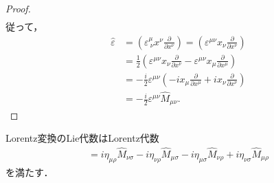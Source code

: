 \begin{proof}
\begin{align}
	\end{align}
	従って，
	\begin{align}
		\hat{\varepsilon} & =\left(\varepsilon^{\mu}_{\ \nu}x^{\nu}\frac{\partial}{\partial{}x^{\nu}}\right)=\left(\varepsilon^{\mu\nu}x_{\nu}\frac{\partial}{\partial{}x^{\nu}}\right) \\
		                  & =\frac{1}{2}\left(\varepsilon^{\mu\nu}x_{\nu}\frac{\partial}{\partial{}x^{\nu}}-\varepsilon^{\mu\nu}x_{\mu}\frac{\partial}{\partial{}x^{\mu}}\right)        \\
		                  & =-\frac{i}{2}\varepsilon^{\mu\nu}\left(-ix_{\mu}\frac{\partial}{\partial{}x^{\mu}}+ix_{\nu}\frac{\partial}{\partial{}x^{\nu}}\right)                        \\
		                  & =-\frac{i}{2}\varepsilon^{\mu\nu}\hat{M}_{\mu\nu}.
	\end{align}
\end{proof}
\begin{prop}[Lorentz代数]
	Lorentz変換のLie代数はLorentz代数
	\begin{align}
		[\hat{M}_{\mu\nu},\hat{M}_{\rho\sigma}]=i\eta_{\mu\rho}\hat{M}_{\nu\sigma}-i\eta_{\nu\rho}\hat{M}_{\mu\sigma}-i\eta_{\mu\sigma}\hat{M}_{\nu\rho}+i\eta_{\nu\sigma}\hat{M}_{\mu\rho}
	\end{align}
	を満たす．
\end{prop}
